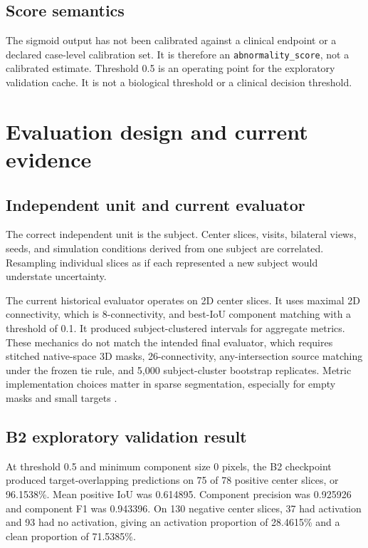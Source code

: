\documentclass[11pt]{article}
\newcommand{\scoreterm}{\texttt{abnormality\_score}}
\begin{document}
\subsection{Score semantics}

The sigmoid output has not been calibrated against a clinical endpoint or a declared case-level calibration set. It is therefore an \scoreterm, not a calibrated estimate. Threshold 0.5 is an operating point for the exploratory validation cache. It is not a biological threshold or a clinical decision threshold.

\section{Evaluation design and current evidence}

\subsection{Independent unit and current evaluator}

The correct independent unit is the subject. Center slices, visits, bilateral views, seeds, and simulation conditions derived from one subject are correlated. Resampling individual slices as if each represented a new subject would understate uncertainty.

The current historical evaluator operates on 2D center slices. It uses maximal 2D connectivity, which is 8-connectivity, and best-IoU component matching with a threshold of 0.1. It produced subject-clustered intervals for aggregate metrics. These mechanics do not match the intended final evaluator, which requires stitched native-space 3D masks, 26-connectivity, any-intersection source matching under the frozen tie rule, and 5,000 subject-cluster bootstrap replicates. Metric implementation choices matter in sparse segmentation, especially for empty masks and small targets \citep{metricPitfalls2021}.

\subsection{B2 exploratory validation result}

At threshold 0.5 and minimum component size 0 pixels, the B2 checkpoint produced target-overlapping predictions on 75 of 78 positive center slices, or 96.1538\%. Mean positive IoU was 0.614895. Component precision was 0.925926 and component F1 was 0.943396. On 130 negative center slices, 37 had activation and 93 had no activation, giving an activation proportion of 28.4615\% and a clean proportion of 71.5385\%.
\end{document}
